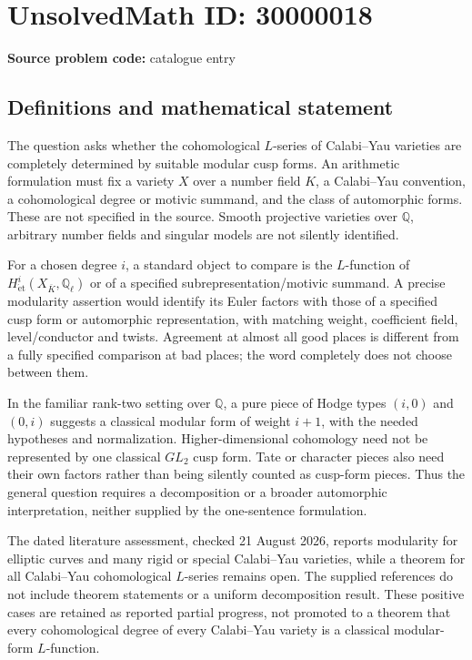 \documentclass[11pt]{article}
\newcommand{\Q}{\mathbb{Q}}
\begin{document}
\section*{UnsolvedMath ID: 30000018}
\textbf{Source problem code:} catalogue entry
\subsection{Definitions and mathematical statement}
The question asks whether the cohomological $L$-series of Calabi--Yau varieties are completely determined by suitable modular cusp forms. An arithmetic formulation must fix a variety $X$ over a number field $K$, a Calabi--Yau convention, a cohomological degree or motivic summand, and the class of automorphic forms. These are not specified in the source. Smooth projective varieties over $\Q$, arbitrary number fields and singular models are not silently identified.

For a chosen degree $i$, a standard object to compare is the $L$-function of $H^i_{\mathrm{\acute et}}(X_{\overline K},\Q_\ell)$ or of a specified subrepresentation/motivic summand. A precise modularity assertion would identify its Euler factors with those of a specified cusp form or automorphic representation, with matching weight, coefficient field, level/conductor and twists. Agreement at almost all good places is different from a fully specified comparison at bad places; the word completely does not choose between them.

In the familiar rank-two setting over $\Q$, a pure piece of Hodge types $(i,0)$ and $(0,i)$ suggests a classical modular form of weight $i+1$, with the needed hypotheses and normalization. Higher-dimensional cohomology need not be represented by one classical $GL_2$ cusp form. Tate or character pieces also need their own factors rather than being silently counted as cusp-form pieces. Thus the general question requires a decomposition or a broader automorphic interpretation, neither supplied by the one-sentence formulation.

The dated literature assessment, checked 21 August 2026, reports modularity for elliptic curves and many rigid or special Calabi--Yau varieties, while a theorem for all Calabi--Yau cohomological $L$-series remains open. The supplied references do not include theorem statements or a uniform decomposition result. These positive cases are retained as reported partial progress, not promoted to a theorem that every cohomological degree of every Calabi--Yau variety is a classical modular-form $L$-function.
\end{document}
